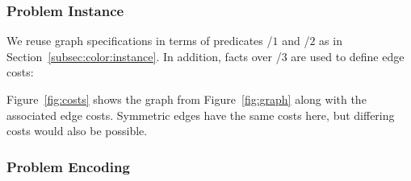 \subsubsection{Problem Instance}\label{subsec:tsp:instance}


We reuse graph specifications in terms of predicates /$1$ and /$2$
as in Section~\ref{subsec:color:instance}.
In addition, facts over /$3$ are used to define edge costs:
%

%
Figure~\ref{fig:costs} shows the graph from Figure~\ref{fig:graph}
along with the associated edge costs.
Symmetric edges have the same costs here,
but differing costs would also be possible.


\subsubsection{Problem Encoding}\label{subsec:tsp:encoding}

